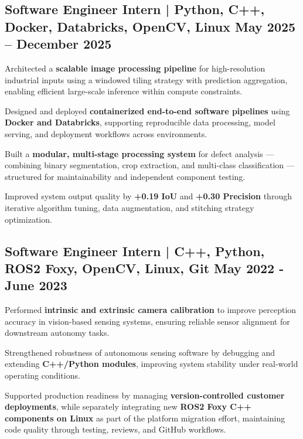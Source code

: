 
\subsection{{Software Engineer Intern | Python, C++, Docker, Databricks, OpenCV, Linux \hfill May 2025 -- December 2025}}
\begin{zitemize}
    \item Architected a \textbf{scalable image processing pipeline} for high-resolution industrial inputs using a windowed tiling strategy with prediction aggregation, enabling efficient large-scale inference within compute constraints.

    \item Designed and deployed \textbf{containerized end-to-end software pipelines} using \textbf{Docker and Databricks}, supporting reproducible data processing, model serving, and deployment workflows across environments.

    \item Built a \textbf{modular, multi-stage processing system} for defect analysis — combining binary segmentation, crop extraction, and multi-class classification — structured for maintainability and independent component testing.

    \item Improved system output quality by \textbf{+0.19 IoU} and \textbf{+0.30 Precision} through iterative algorithm tuning, data augmentation, and stitching strategy optimization.

\end{zitemize}




\subsection{{Software Engineer Intern | C++, Python, ROS2 Foxy, OpenCV, Linux, Git \hfill May 2022 - June 2023}}
\begin{zitemize}
    \item Performed \textbf{intrinsic and extrinsic camera calibration} to improve perception accuracy in vision-based sensing systems, ensuring reliable sensor alignment for downstream autonomy tasks.

    \item Strengthened robustness of autonomous sensing software by debugging and extending \textbf{C++/Python modules}, improving system stability under real-world operating conditions.

    \item Supported production readiness by managing \textbf{version-controlled customer deployments}, while separately integrating new \textbf{ROS2 Foxy C++ components on Linux} as part of the platform migration effort, maintaining code quality through testing, reviews, and GitHub workflows.
\end{zitemize}



